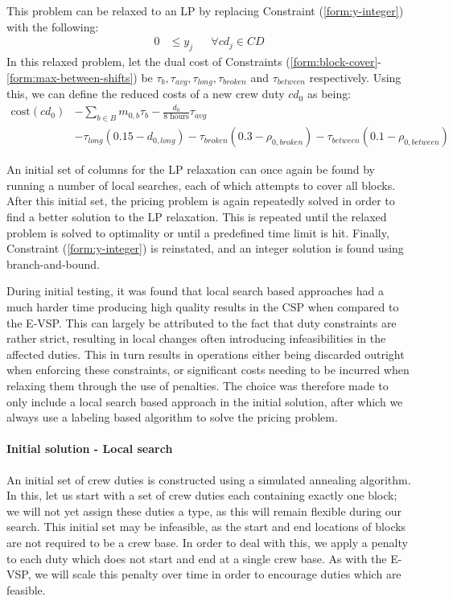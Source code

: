 \documentclass[]{article}
\begin{document}
This problem can be relaxed to an LP by replacing Constraint (\ref{form:y-integer}) with the following:
\begin{align}
0 &\leq y_{j} && \forall cd_j \in \textit{CD}
\end{align}
In this relaxed problem, let the dual cost of Constraints (\ref{form:block-cover}-\ref{form:max-between-shifts}) be $\tau_{b}, \tau_{\textit{avg}}, \tau_{\textit{long}}, \tau_{\textit{broken}}$ and $\tau_{\textit{between}}$ respectively. Using this, we can define the reduced costs of a new crew duty $cd_0$ as being: 
\begin{align}
\text{cost}(cd_0) 
&- \sum_{b \in B} m_{0,b} \tau_{b} 
- \frac{d_0}{\text{8 hours}} \tau_{\textit{avg}} \nonumber \\
&- \tau_{\textit{long}} (0.15 - d_{0,\textit{long}}) 
- \tau_{\textit{broken}} (0.3 - \rho_{0,\textit{broken}}) 
- \tau_{\textit{between}} (0.1 - \rho_{0,\textit{between}})
\end{align}

An initial set of columns for the LP relaxation can once again be found by running a number of local searches, each of which attempts to cover all blocks. After this initial set, the pricing problem is again repeatedly solved in order to find a better solution to the LP relaxation. This is repeated until the relaxed problem is solved to optimality or until a predefined time limit is hit. Finally, Constraint (\ref{form:y-integer}) is reinstated, and an integer solution is found using branch-and-bound.

During initial testing, it was found that local search based approaches had a much harder time producing high quality results in the CSP when compared to the E-VSP. This can largely be attributed to the fact that duty constraints are rather strict, resulting in local changes often introducing infeasibilities in the affected duties. This in turn results in operations either being discarded outright when enforcing these constraints, or significant costs needing to be incurred when relaxing them through the use of penalties. The choice was therefore made to only include a local search based approach in the initial solution, after which we always use a labeling based algorithm to solve the pricing problem.   

\paragraph{Initial solution - Local search}
An initial set of crew duties is constructed using a simulated annealing algorithm. In this, let us start with a set of crew duties each containing exactly one block; we will not yet assign these duties a type, as this will remain flexible during our search. This initial set may be infeasible, as the start and end locations of blocks are not required to be a crew base. In order to deal with this, we apply a penalty to each duty which does not start and end at a single crew base. As with the E-VSP, we will scale this penalty over time in order to encourage duties which are feasible. 
\end{document}
